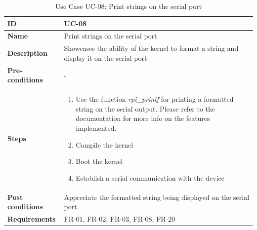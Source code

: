 \begin{table}[H]
    \centering
    \begin{tabular}{| p{3cm} | p{7cm} |}
    \hline
    \textbf{ID}             & UC-08 \\ \hline
    \textbf{Name}           & Print strings on the serial port\\ \hline
    \textbf{Description}    & Showcases the ability of the kernel to format a string and display it on the serial port
	\\ \hline
    \textbf{Pre-conditions} & - \\ \hline
    \textbf{Steps}          &   \begin{enumerate}
                                    \item Use the function \textit{rpi\_printf} for printing a formatted string on the serial output. Please refer to the documentation for more info on the features implemented.  
                                    \item Compile the kernel
                                    \item Boot the kernel
                                    \item Establish a serial communication with the device
                                \end{enumerate}
 \\ \hline
    \textbf{Post conditions} & 	Appreciate the formatted string being displayed on the serial port.
    							   	\\ \hline
    \textbf{Requirements}       &  FR-01, FR-02, FR-03, FR-08, FR-20 \\ \hline
    \end{tabular}
    \caption{Use Case UC-08: Print strings on the serial port}
\end{table}


